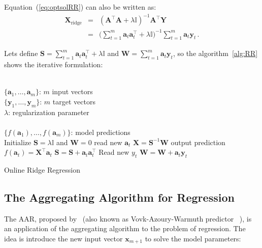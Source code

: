 Equation~(\ref{eq:optsolRR}) can also be written as:
\begin{eqnarray*}
\label{eq:RReapand}
\mathbf{\mathbf{X}}_{\text{ridge}}&=&(\mathbf{A}^\top \mathbf{A}+ \lambda
\mathbb{I})^{-1}\mathbf{A}^\top \mathbf{Y} \\
&=& \displaystyle \big (\sum_{t=1}^m
\mathbf{a}_t \mathbf{a}_t  ^\top + \lambda \mathbb{I}\big )^{-1}
\sum_{t=1}^m \mathbf{a}_t \mathbf{y}_t \, .
\end{eqnarray*}

Lets define $\displaystyle\mathbf{S}= \sum_{t=1}^m \mathbf{a}_t
\mathbf{a}_t  ^\top + \lambda \mathbb{I} $ and $\mathbf{W}=
\displaystyle\sum_{t=1}^m \mathbf{a}_t \mathbf{y}_t$, so the
algorithm~\ref{alg:RR} shows the iterative formulation:

\begin{algorithm}[H]
\begin{algorithmic}[1]
\REQUIRE $\,$ \\
$\{\mathbf{a}_1,\dots,\mathbf{a}_{m} \}$: $m$ input vectors \\
$\{\mathbf{y}_1,\dots,\mathbf{y}_{m} \}$: $m$ target vectors \\
$\lambda$: regularization parameter \\
\ENSURE  $\,$ \\
$\{f(\mathbf{a}_1),\dots,f(\mathbf{a}_{m}) \}$: model predictions \\
\STATE Initialize $\mathbf{S}=\lambda \mathbb{I}$
and $\mathbf{W}=0$
	\STATE read new $\mathbf{a}_t$
	\STATE $\mathbf{X}=\mathbf{S}^{-1}\mathbf{W}$
	\STATE output prediction $f(\mathbf{a}_t) = \mathbf{X}^\top \mathbf{a}_t$
   	\STATE $\mathbf{S} = \mathbf{S} + \mathbf{a}_t \mathbf{a}_t^\top$
   	\STATE Read new $y_t$
    	\STATE $\mathbf{W} = \mathbf{W} + \mathbf{a}_t \mathbf{y}_t$
\ENDFOR
\end{algorithmic}
\caption{Online Ridge Regression}
\label{alg:RR}
\end{algorithm}



\subsection{The Aggregating Algorithm for Regression}

The AAR, proposed by~\cite{vovk2001} (also known as Vovk-Azoury-Warmuth predictor ~\cite{azoury2001}), is an application of the aggregating
algorithm to the problem of regression. The idea is introduce the new input
vector $\mathbf{x}_{m+1}$ to solve the model parameters: 

